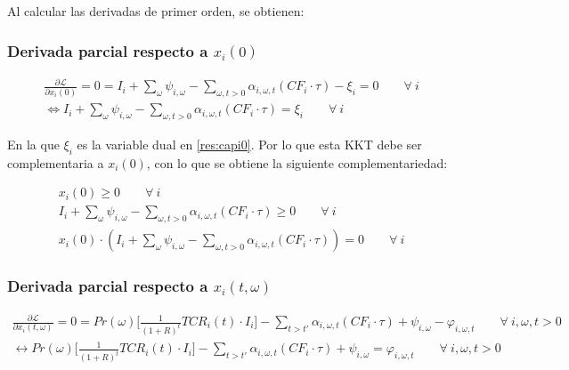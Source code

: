 Al calcular las derivadas de primer orden, se obtienen:

\subsubsection{Derivada parcial respecto a $x_i(0)$}
\begin{footnotesize}
\begin{align}
    \frac{\partial \mathcal{L} }{\partial x_i(0)} = 0 = I_i  + \sum_{\omega}\psi_{i,\omega} -\sum_{\omega, t>0} \alpha_{i,\omega,t}(CF_i\cdot \tau) -\xi_i=0  \qquad \forall \  i \\
    \Leftrightarrow I_i  + \sum_{\omega}\psi_{i,\omega} -\sum_{\omega, t>0} \alpha_{i,\omega,t}(CF_i\cdot \tau) = \xi_i  \qquad \forall \  i 
\end{align}
\end{footnotesize}


En la que $\xi_i$ es la variable dual en \ref{res:capi0}. Por lo que esta KKT debe ser complementaria a $x_i(0)$, con lo que se obtiene la siguiente complementariedad:

\begin{footnotesize}
\begin{align}
    x_i(0)\geq 0 \qquad \forall \  i \\
    I_i  + \sum_{\omega}\psi_{i,\omega} -\sum_{\omega, t>0} \alpha_{i,\omega,t}(CF_i\cdot \tau) \geq 0  \qquad \forall \  i\\
    x_i(0)\cdot(I_i  + \sum_{\omega}\psi_{i,\omega} -\sum_{\omega, t>0} \alpha_{i,\omega,t}(CF_i\cdot \tau))=0 \qquad \forall \  i
\end{align}
\end{footnotesize}



\subsubsection{Derivada parcial respecto a $x_i(t,\omega)$}

\begin{footnotesize}
\begin{align}
    \frac{\partial \mathcal{L} }{\partial x_i(t,\omega)}= 0 = Pr(\omega) \Bigg[\frac{1}{(1+R)^t}TCR_i(t) \cdot I_i \Bigg] - \sum_{t> t\prime}\alpha_{i,\omega,t} ( CF_i \cdot \tau)+ \psi_{i,\omega}-\varphi_{i,\omega,t} \qquad  \forall \  i, \omega, t> 0\\
    \leftrightarrow Pr(\omega) \Bigg[\frac{1}{(1+R)^t}TCR_i(t) \cdot I_i \Bigg] - \sum_{t> t\prime}\alpha_{i,\omega,t} ( CF_i \cdot \tau)+ \psi_{i,\omega}=\varphi_{i,\omega,t} \qquad  \forall \  i, \omega, t> 0
\end{align}
\end{footnotesize}


